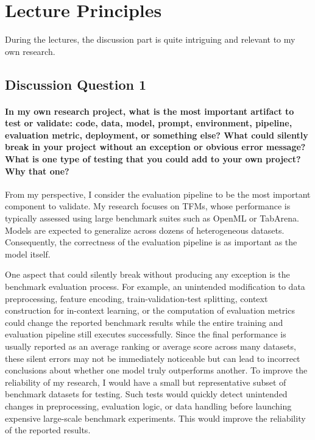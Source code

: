 \documentclass[11pt]{article}
\begin{document}
\section{Lecture Principles}
During the lectures, the discussion part is quite intriguing and relevant to my own research. 

\subsection{Discussion Question 1}
\paragraph{In my own research project, what is the most important artifact to test or validate: code, data, model, prompt, environment, pipeline, evaluation metric, deployment, or something else?
What could silently break in your project without an exception or obvious error message?
What is one type of testing that you could add to your own project? Why that one?}

From my perspective, I consider the evaluation pipeline to be the most important component to validate. My research focuses on TFMs, whose performance is typically assessed using large benchmark suites such as OpenML\cite{bischl2017openml} or TabArena\cite{erickson2026tabarena}. Models are expected to generalize across dozens of heterogeneous datasets. Consequently, the correctness of the evaluation pipeline is as important as the model itself.

One aspect that could silently break without producing any exception is the benchmark evaluation process. For example, an unintended modification to data preprocessing, feature encoding, train-validation-test splitting, context construction for in-context learning, or the computation of evaluation metrics could change the reported benchmark results while the entire training and evaluation pipeline still executes successfully. Since the final performance is usually reported as an average ranking or average score across many datasets, these silent errors may not be immediately noticeable but can lead to incorrect conclusions about whether one model truly outperforms another. To improve the reliability of my research, I would have a small but representative subset of benchmark datasets for testing. Such tests would quickly detect unintended changes in preprocessing, evaluation logic, or data handling before launching expensive large-scale benchmark experiments. This would improve the reliability of the reported results.
\end{document}
